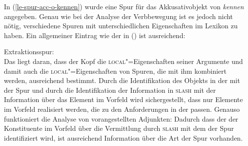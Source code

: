 \noindent
In (\ref{le-spur-acc-o-kennen}) wurde eine Spur für das Akkusativobjekt von \emph{kennen} angegeben.
Genau wie bei der Analyse der Verbbewegung ist es jedoch nicht nötig, verschiedene Spuren mit unterschiedlichen
Eigenschaften im Lexikon zu haben. Ein allgemeiner Eintrag wie der in () ist ausreichend:

\eas
\label{le-extraktionsspur}
Extraktionsspur: \\
\zs
Das liegt daran, dass der Kopf die \textsc{local}"=Eigenschaften seiner Argumente und damit auch die
\textsc{local}"=Eigenschaften von Spuren, die mit ihm kombiniert werden, ausreichend bestimmt. Durch
die Identifikation des Objekts in der \compsl mit der Spur und durch die Identifikation der
Information in \textsc{slash} mit der Information über das Element im Vorfeld wird sichergestellt,
dass nur Elemente im Vorfeld realisiert werden, die zu den Anforderungen in der \compsl
passen. Genauso funktioniert die Analyse von vorangestellten Adjunkten: Dadurch dass der
\localw der Konstituente im Vorfeld über die Vermittlung durch \textsc{slash} mit dem \localw der Spur
identifiziert wird, ist ausreichend Information über die Art der Spur vorhanden.



